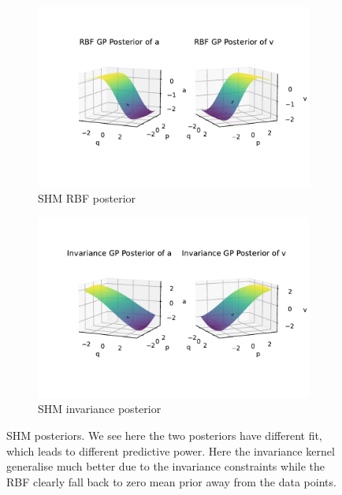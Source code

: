 \documentclass{statsmsc}
\begin{document}
\begin{figure}[H]
     \centering
     \begin{subfigure}[b]{\linewidth}
        \centering
        \includegraphics[width=\linewidth]{../codes/figures/posterior_shm_rbf.pdf}
        \caption{SHM RBF posterior}
        \label{fig:posterior_shm_rbf}
     \end{subfigure}
     \hfill
     \begin{subfigure}[b]{\linewidth}
         \centering
         \includegraphics[width=\linewidth]{../codes/figures/posterior_shm_invariance.pdf}
         \caption{SHM invariance posterior}
         \label{fig:posterior_shm_invariance}
     \end{subfigure}
        \caption{SHM posteriors. We see here the two posteriors have different fit, which leads to different predictive power. Here the invariance kernel generalise much better due to the invariance constraints while the RBF clearly fall back to zero mean prior away from the data points.}
        \label{fig:posterior_shm}
\end{figure}
\end{document}
